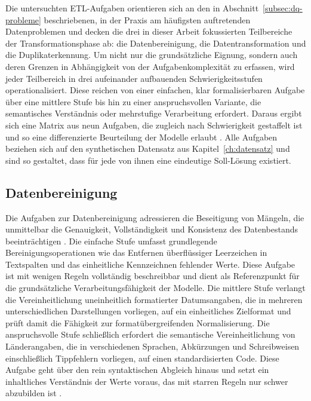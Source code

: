 Die untersuchten \ac{ETL}-Aufgaben orientieren sich an den in Abschnitt~\ref{subsec:dq-probleme} beschriebenen, in der Praxis am häufigsten auftretenden Datenproblemen und decken die drei in dieser Arbeit fokussierten Teilbereiche der Transformationsphase ab: die Datenbereinigung, die Datentransformation und die Duplikaterkennung. Um nicht nur die grundsätzliche Eignung, sondern auch deren Grenzen in Abhängigkeit von der Aufgabenkomplexität zu erfassen, wird jeder Teilbereich in drei aufeinander aufbauenden Schwierigkeitsstufen operationalisiert. Diese reichen von einer einfachen, klar formalisierbaren Aufgabe über eine mittlere Stufe bis hin zu einer anspruchsvollen Variante, die semantisches Verständnis oder mehrstufige Verarbeitung erfordert. Daraus ergibt sich eine Matrix aus neun Aufgaben, die zugleich nach Schwierigkeit gestaffelt ist und so eine differenzierte Beurteilung der Modelle erlaubt \autocite{coteDataCleaningMachine2024,ridzuanReviewDataQuality2024}. Alle Aufgaben beziehen sich auf den synthetischen Datensatz aus Kapitel~\ref{ch:datensatz} und sind so gestaltet, dass für jede von ihnen eine eindeutige Soll-Lösung existiert.

\subsection{Datenbereinigung}
\label{subsec:aufgabe-bereinigung}

Die Aufgaben zur Datenbereinigung adressieren die Beseitigung von Mängeln, die unmittelbar die Genauigkeit, Vollständigkeit und Konsistenz des Datenbestands beeinträchtigen \autocite{coteDataCleaningMachine2024,rangineniReviewEnhancingData2023}. Die einfache Stufe umfasst grundlegende Bereinigungsoperationen wie das Entfernen überflüssiger Leerzeichen in Textspalten und das einheitliche Kennzeichnen fehlender Werte. Diese Aufgabe ist mit wenigen Regeln vollständig beschreibbar und dient als Referenzpunkt für die grundsätzliche Verarbeitungsfähigkeit der Modelle. Die mittlere Stufe verlangt die Vereinheitlichung uneinheitlich formatierter Datumsangaben, die in mehreren unterschiedlichen Darstellungen vorliegen, auf ein einheitliches Zielformat und prüft damit die Fähigkeit zur formatübergreifenden Normalisierung. Die anspruchsvolle Stufe schließlich erfordert die semantische Vereinheitlichung von Länderangaben, die in verschiedenen Sprachen, Abkürzungen und Schreibweisen einschließlich Tippfehlern vorliegen, auf einen standardisierten Code. Diese Aufgabe geht über den rein syntaktischen Abgleich hinaus und setzt ein inhaltliches Verständnis der Werte voraus, das mit starren Regeln nur schwer abzubilden ist \autocite{hassaniRoleChatGPTData2023,khanCognitiveETLUsing2025}.

